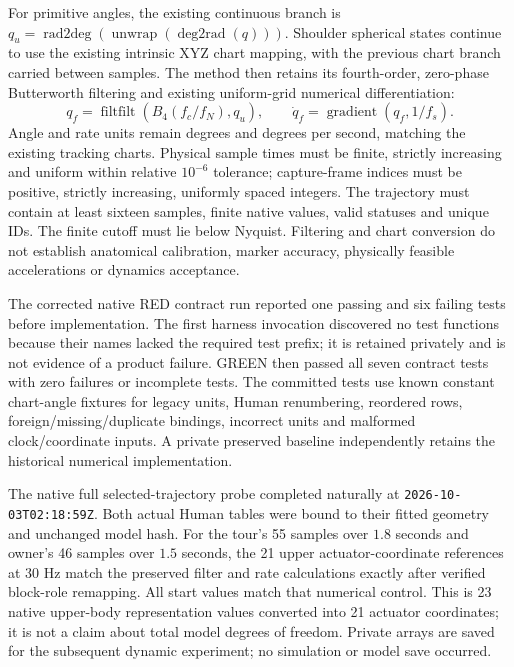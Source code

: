 \documentclass[11pt,a4paper]{article}
\begin{document}
For primitive angles, the existing continuous branch is
$q_u=\operatorname{rad2deg}(\operatorname{unwrap}(\operatorname{deg2rad}(q)))$.
Shoulder spherical states continue to use the existing intrinsic XYZ chart
mapping, with the previous chart branch carried between samples. The method
then retains its fourth-order, zero-phase Butterworth filtering and existing
uniform-grid numerical differentiation:
\[
 q_f=\operatorname{filtfilt}(B_4(f_c/f_N),q_u),\qquad
 \dot q_f=\operatorname{gradient}(q_f,1/f_s).
\]
Angle and rate units remain degrees and degrees per second, matching the
existing tracking charts. Physical sample times must be finite, strictly
increasing and uniform within relative $10^{-6}$ tolerance; capture-frame
indices must be positive, strictly increasing, uniformly spaced integers.
The trajectory must contain at least sixteen samples, finite native values,
valid statuses and unique IDs. The finite cutoff must lie below Nyquist.
Filtering and chart conversion do not establish anatomical calibration,
marker accuracy, physically feasible accelerations or dynamics acceptance.

The corrected native RED contract run reported one passing and six failing
tests before implementation. The first harness invocation discovered no
test functions because their names lacked the required test prefix; it is
retained privately and is not evidence of a product failure. GREEN then
passed all seven contract tests with zero failures or incomplete tests.
The committed tests use known constant chart-angle fixtures for legacy units,
Human renumbering, reordered rows, foreign/missing/duplicate bindings,
incorrect units and malformed clock/coordinate inputs. A private preserved
baseline independently retains the historical numerical implementation.

The native full selected-trajectory probe completed naturally at
\texttt{2026-10-03T02:18:59Z}. Both actual Human tables were bound to their
fitted geometry and unchanged model hash. For the tour's 55 samples over
$1.8$ seconds and owner's 46 samples over $1.5$ seconds, the 21 upper
actuator-coordinate references at $30$ Hz match the preserved filter and
rate calculations exactly after verified block-role remapping. All start
values match that numerical control. This is 23 native upper-body
representation values converted into 21 actuator coordinates; it is not
a claim about total model degrees of freedom. Private arrays are saved for
the subsequent dynamic experiment; no simulation or model save occurred.
\end{document}
